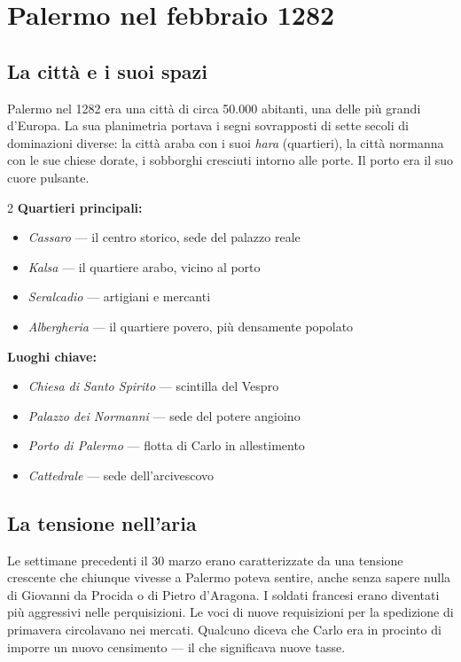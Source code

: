 \secsep

\section{Palermo nel febbraio 1282}

\subsection{La città e i suoi spazi}

Palermo nel 1282 era una città di circa 50.000 abitanti, una delle più
grandi d'Europa. La sua planimetria portava i segni sovrapposti di sette
secoli di dominazioni diverse: la città araba con i suoi \textit{hara}
(quartieri), la città normanna con le sue chiese dorate, i sobborghi
cresciuti intorno alle porte. Il porto era il suo cuore pulsante.

\begin{multicols}{2}
\noindent\textbf{Quartieri principali:}
\begin{itemize}[leftmargin=*, nosep]
  \item \textit{Cassaro} — il centro storico, sede del palazzo reale
  \item \textit{Kalsa} — il quartiere arabo, vicino al porto
  \item \textit{Seralcadio} — artigiani e mercanti
  \item \textit{Albergheria} — il quartiere povero, più densamente popolato
\end{itemize}

\columnbreak

\noindent\textbf{Luoghi chiave:}
\begin{itemize}[leftmargin=*, nosep]
  \item \textit{Chiesa di Santo Spirito} — scintilla del Vespro
  \item \textit{Palazzo dei Normanni} — sede del potere angioino
  \item \textit{Porto di Palermo} — flotta di Carlo in allestimento
  \item \textit{Cattedrale} — sede dell'arcivescovo
\end{itemize}
\end{multicols}

\subsection{La tensione nell'aria}

Le settimane precedenti il 30 marzo erano caratterizzate da una tensione
crescente che chiunque vivesse a Palermo poteva sentire, anche senza
sapere nulla di Giovanni da Procida o di Pietro d'Aragona. I soldati
francesi erano diventati più aggressivi nelle perquisizioni. Le voci di
nuove requisizioni per la spedizione di primavera circolavano nei mercati.
Qualcuno diceva che Carlo era in procinto di imporre un nuovo censimento
— il che significava nuove tasse.

